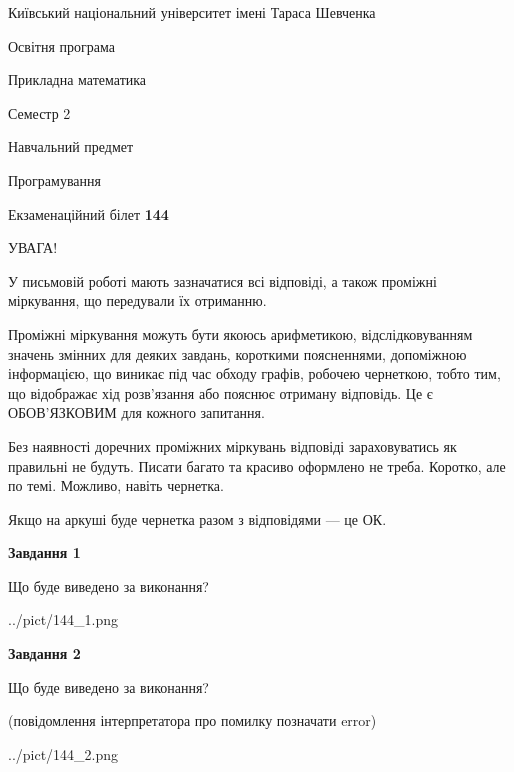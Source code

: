 \documentclass[12pt, ukrainian]{article}
\begin{document}
{{\begin {small}\par
{ \center  Київський національний університет імені Тараса Шевченка \par}
{\parbox {5 cm}{Освітня програма \hfill}{\parbox {7 cm}{Прикладна математика\hfill}}\parbox {6 cm}{\hfill Семестр 2}}\par
{\parbox {5 cm} {Навчальний предмет \hfill}\parbox {7 cm}{Програмування \hfill}\parbox {6cm}{\hfill}\par}\vspace{-7pt} \end{small}}{\center Екзаменаційний білет \No \textbf
{ 144 }\par}}
{
\begin {large}
УВАГА!

У письмовій роботі мають зазначатися всі відповіді, а також проміжні міркування, що передували їх отриманню.

Проміжні міркування можуть бути якоюсь арифметикою, відслідковуванням зна\-чень змінних для деяких завдань,
короткими поясненнями, допоміжною інформацією, що виникає під час обходу графів, робочею чернеткою,
тобто тим, що відображає хід розв’язання або пояснює отриману відповідь.
Це є ОБОВ’ЯЗКОВИМ для кожного запитання.

Без наявності доречних проміжних міркувань відповіді зараховуватись як правиль\-ні не будуть.
Писати багато та красиво оформлено не треба. Коротко, але по темі. Можли\-во, навіть чернетка.

Якщо на аркуші буде чернетка разом з відповідями --- це ОК.

\newpage

{\begin {center}\textbf{Завдання 1}\end {center}}\par
Що буде виведено за виконання?\par
\begin{center}
	{../pict/144_1.png}
\end{center}
\newpage

{\begin {center}\textbf{Завдання 2}\end {center}}\par
Що буде виведено за виконання?\par
 (повідомлення інтерпретатора про помилку позначати error)\par
\begin{center}
	{../pict/144_2.png}
\end{center}
\newpage


\end{large}}
\end{document}
